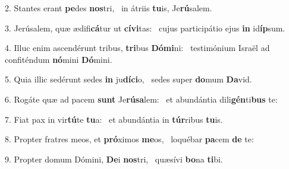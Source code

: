 2. Stantes erant \textbf{pe}des \textbf{nos}tri, \ast\  in átriis \textbf{tu}is, Je\textbf{rú}salem.\

3. Jerúsalem, quæ ædifi\textbf{cá}tur ut \textbf{cí}\textbf{vi}tas: \ast\  cujus participátio ejus \textbf{in} id\textbf{íp}sum.\

4. Illuc enim ascendérunt tribus, \textbf{tri}bus \textbf{Dó}\textbf{mi}ni: \ast\  testimónium Israël ad confiténdum \textbf{nó}mini \textbf{Dó}mini.\

5. Quia illic sedérunt sedes \textbf{in} ju\textbf{dí}\textbf{ci}o, \ast\  sedes super \textbf{do}mum \textbf{Da}vid.\

6. Rogáte quæ ad pacem \textbf{sunt} Je\textbf{rú}\textbf{sa}lem: \ast\  et abundántia dili\textbf{gén}ti\textbf{bus} te:\

7. Fiat pax in vir\textbf{tú}te \textbf{tu}a: \ast\  et abundántia in \textbf{túr}ribus \textbf{tu}is.\

8. Propter fratres meos, et \textbf{pró}ximos \textbf{me}os, \ast\  loquébar \textbf{pa}cem \textbf{de} te:\

9. Propter domum Dómini, \textbf{De}i \textbf{nos}tri, \ast\  quæsívi \textbf{bo}na \textbf{ti}bi.\

